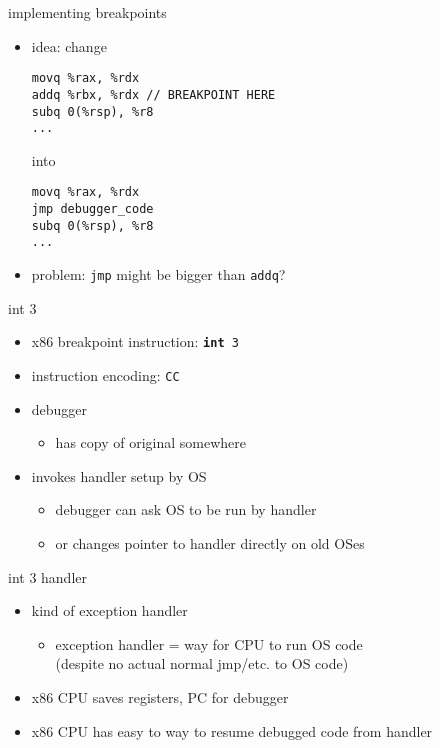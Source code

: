 
\begin{frame}[fragile,label=implBreak]{implementing breakpoints}
\lstset{language=myasm,style=small}
\begin{itemize}
    \item idea: change
\begin{lstlisting}
movq %rax, %rdx
addq %rbx, %rdx // BREAKPOINT HERE
subq 0(%rsp), %r8
...
\end{lstlisting}
into
\begin{lstlisting}
movq %rax, %rdx
jmp debugger_code 
subq 0(%rsp), %r8
...
\end{lstlisting}
    \item<2> problem: {\tt jmp} might be bigger than {\tt addq}?
\end{itemize}
\end{frame}

\begin{frame}[fragile,label=implBreak2]{int 3}
    \begin{itemize}
    \item x86 breakpoint instruction: {\tt \textbf{int} 3}
    \item {} instruction encoding: {\tt CC}
    \item debugger 
        \begin{itemize}
        \item has copy of original somewhere
        \end{itemize}
    \item invokes handler setup by OS
        \begin{itemize}
        \item debugger can ask OS to be run by handler
        \item or changes pointer to handler directly on old OSes
        \end{itemize}
    \end{itemize}
\end{frame}

\begin{frame}{int 3 handler}
    \begin{itemize}
    \item kind of exception handler
        \begin{itemize}
        \item exception handler = way for CPU to run OS code \\
        (despite no actual normal jmp/etc. to OS code)
        \end{itemize}
    \item x86 CPU saves registers, PC for debugger
    \item x86 CPU has easy to way to resume debugged code from handler
    \end{itemize}
\end{frame}

